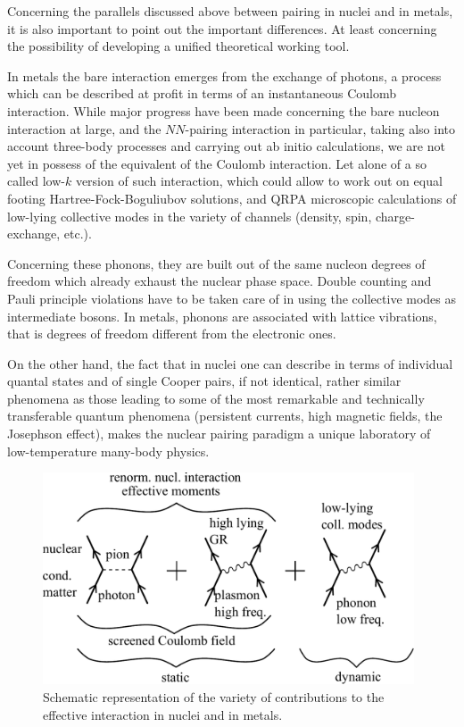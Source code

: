 \begin{subappendices}
Concerning the parallels discussed above between pairing in nuclei and in metals, it is also important to point  out the important differences. At least concerning the possibility of developing a unified theoretical working tool. 

In metals the bare interaction emerges from the exchange of photons, a process which can be described at profit in terms of an instantaneous Coulomb interaction. While major progress have been made concerning the bare nucleon interaction at large, and the $NN$-pairing interaction in particular, taking also into account three-body processes and carrying out ab initio calculations, we are not yet in possess of the equivalent of the Coulomb interaction.  Let alone of a so called low-$k$ version of such interaction, which could allow to work out on equal footing Hartree-Fock-Boguliubov solutions, and QRPA microscopic calculations of low-lying collective modes in the variety of channels (density, spin, charge-exchange, etc.).

Concerning these phonons, they are built out of the same nucleon degrees of freedom which already exhaust the nuclear phase space. Double counting and Pauli principle violations have to be taken care of in using the collective modes as intermediate bosons. In metals, phonons are associated with lattice vibrations, that is degrees of freedom different from the electronic ones.

On the other hand, the fact that in nuclei one can describe in terms of individual quantal states and of single Cooper pairs, if not identical, rather similar phenomena as those leading to some of the most remarkable and technically transferable quantum phenomena (persistent currents, high magnetic fields, the Josephson effect), makes the nuclear pairing paradigm a unique laboratory of low-temperature many-body physics. 
   \begin{figure}
   	\centerline{\includegraphics*[width=11cm,angle=0	]{nutshell/figs/fig3A4}}
   	\caption{Schematic representation of the variety of contributions to the effective interaction in nuclei and in metals.}\label{fig3.A.4}
   \end{figure}


\end{subappendices}
